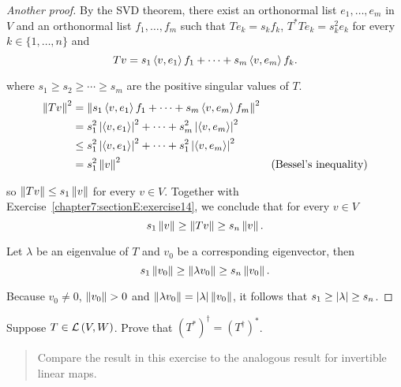 \begin{proof}[Another proof]
    By the SVD theorem, there exist an orthonormal list $e_{1}, \ldots, e_{m}$ in $V$ and an orthonormal list $f_{1}, \ldots, f_{m}$ such that $Te_{k} = s_{k}f_{k}$, $T^{*}Te_{k} = s_{k}^{2}e_{k}$ for every $k\in\{1,\ldots,n\}$ and
    \[
        Tv = s_{1}\left\langle{v,e_{1}}\right\rangle f_{1} + \cdots + s_{m}\left\langle{v,e_{m}}\right\rangle f_{k}.
    \]

    where $s_{1}\geq s_{2}\geq \cdots \geq s_{m}$ are the positive singular values of $T$.
    \begin{align*}
        \left\Vert{Tv}\right\Vert^{2} & = \left\Vert{s_{1}\left\langle{v,e_{1}}\right\rangle f_{1} + \cdots + s_{m}\left\langle{v,e_{m}}\right\rangle f_{m}}\right\Vert^{2}                                           \\
                      & = s_{1}^{2}\left\vert{\left\langle{v, e_{1}}\right\rangle}\right\vert^{2} + \cdots + s_{m}^{2}\left\vert{\left\langle{v, e_{m}}\right\rangle}\right\vert^{2}                                  \\
                      & \leq s_{1}^{2}\left\vert{\left\langle{v, e_{1}}\right\rangle}\right\vert^{2} + \cdots + s_{1}^{2}\left\vert{\left\langle{v,e_{m}}\right\rangle}\right\vert^{2}                                \\
                      & = s_{1}^{2}\left\Vert{v}\right\Vert^{2}                                                                        & \text{(Bessel's inequality)}
    \end{align*}

    so $\left\Vert{Tv}\right\Vert\leq s_{1}\left\Vert{v}\right\Vert$ for every $v\in V$. Together with Exercise~\ref{chapter7:sectionE:exercise14}, we conclude that for every $v\in V$
    \[
        s_{1}\left\Vert{v}\right\Vert\geq \left\Vert{Tv}\right\Vert\geq s_{n}\left\Vert{v}\right\Vert.
    \]

    Let $\lambda$ be an eigenvalue of $T$ and $v_{0}$ be a corresponding eigenvector, then
    \[
        s_{1}\left\Vert{v_{0}}\right\Vert\geq \left\Vert{\lambda v_{0}}\right\Vert\geq s_{n}\left\Vert{v_{0}}\right\Vert.
    \]

    Because $v_{0}\ne 0$, $\left\Vert{v_{0}}\right\Vert > 0$ and $\left\Vert{\lambda v_{0}}\right\Vert = \left\vert{\lambda}\right\vert\left\Vert{v_{0}}\right\Vert$, it follows that $s_{1}\geq \left\vert{\lambda}\right\vert \geq s_{n}$.
\end{proof}
\newpage

\begin{exercise}\label{chapter7:sectionE:exercise16}
    Suppose $T\in\mathcal{L}\left({V, W}\right)$. Prove that ${(T^{*})}^{\dagger} = {(T^{\dagger})}^{*}$.
\end{exercise}

\begin{quote}
    Compare the result in this exercise to the analogous result for invertible
    linear maps.
\end{quote}

